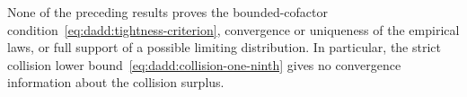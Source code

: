 \begin{remark}
None of the preceding results proves the bounded-cofactor
condition~\eqref{eq:dadd:tightness-criterion}, convergence or
uniqueness of the empirical laws, or full support of a possible
limiting distribution. In particular, the strict collision lower
bound~\eqref{eq:dadd:collision-one-ninth} gives no convergence
information about the collision surplus.
\end{remark}
